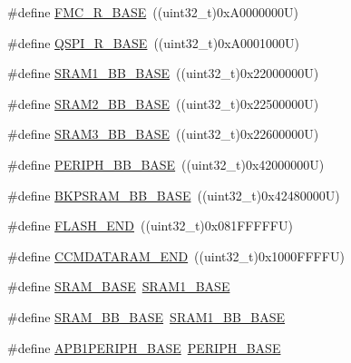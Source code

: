 \begin{DoxyCompactItemize}
\#define \hyperlink{group___peripheral__memory__map_ga7a599164cd92798542bc6288793d1ed5}{F\+M\+C\+\_\+\+R\+\_\+\+B\+A\+SE}~((uint32\+\_\+t)0x\+A0000000\+U)
\item 
\#define \hyperlink{group___peripheral__memory__map_ga3b6b7d9c67dec50557fd634505198e9d}{Q\+S\+P\+I\+\_\+\+R\+\_\+\+B\+A\+SE}~((uint32\+\_\+t)0x\+A0001000\+U)
\item 
\#define \hyperlink{group___peripheral__memory__map_gac4c4f61082e4b168f29d9cf97dc3ca5c}{S\+R\+A\+M1\+\_\+\+B\+B\+\_\+\+B\+A\+SE}~((uint32\+\_\+t)0x22000000\+U)
\item 
\#define \hyperlink{group___peripheral__memory__map_gac33cb6edadf184ab9860d77089503922}{S\+R\+A\+M2\+\_\+\+B\+B\+\_\+\+B\+A\+SE}~((uint32\+\_\+t)0x22500000\+U)
\item 
\#define \hyperlink{group___peripheral__memory__map_gaebfa4db60f9ac39c7c7f3fed98090410}{S\+R\+A\+M3\+\_\+\+B\+B\+\_\+\+B\+A\+SE}~((uint32\+\_\+t)0x22600000\+U)
\item 
\#define \hyperlink{group___peripheral__memory__map_gaed7efc100877000845c236ccdc9e144a}{P\+E\+R\+I\+P\+H\+\_\+\+B\+B\+\_\+\+B\+A\+SE}~((uint32\+\_\+t)0x42000000\+U)
\item 
\#define \hyperlink{group___peripheral__memory__map_gaee19a30c9fa326bb10b547e4eaf4e250}{B\+K\+P\+S\+R\+A\+M\+\_\+\+B\+B\+\_\+\+B\+A\+SE}~((uint32\+\_\+t)0x42480000\+U)
\item 
\#define \hyperlink{group___peripheral__memory__map_ga8be554f354e5aa65370f6db63d4f3ee4}{F\+L\+A\+S\+H\+\_\+\+E\+ND}~((uint32\+\_\+t)0x081\+F\+F\+F\+F\+F\+U)
\item 
\#define \hyperlink{group___peripheral__memory__map_ga9fbe263946209e6f09faf93512bd2f9a}{C\+C\+M\+D\+A\+T\+A\+R\+A\+M\+\_\+\+E\+ND}~((uint32\+\_\+t)0x1000\+F\+F\+F\+F\+U)
\item 
\#define \hyperlink{group___peripheral__memory__map_ga05e8f3d2e5868754a7cd88614955aecc}{S\+R\+A\+M\+\_\+\+B\+A\+SE}~\hyperlink{group___peripheral__memory__map_ga7d0fbfb8894012dbbb96754b95e562cd}{S\+R\+A\+M1\+\_\+\+B\+A\+SE}
\item 
\#define \hyperlink{group___peripheral__memory__map_gad3548b6e2f017f39d399358f3ac98454}{S\+R\+A\+M\+\_\+\+B\+B\+\_\+\+B\+A\+SE}~\hyperlink{group___peripheral__memory__map_gac4c4f61082e4b168f29d9cf97dc3ca5c}{S\+R\+A\+M1\+\_\+\+B\+B\+\_\+\+B\+A\+SE}
\item 
\#define \hyperlink{group___peripheral__memory__map_ga45666d911f39addd4c8c0a0ac3388cfb}{A\+P\+B1\+P\+E\+R\+I\+P\+H\+\_\+\+B\+A\+SE}~\hyperlink{group___peripheral__memory__map_ga9171f49478fa86d932f89e78e73b88b0}{P\+E\+R\+I\+P\+H\+\_\+\+B\+A\+SE}

\end{DoxyCompactItemize}
